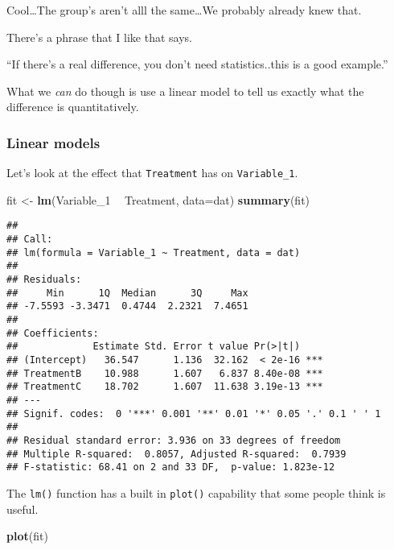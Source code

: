 \documentclass[
]{article}
\newenvironment{Shaded}{\begin{snugshade}}{\end{snugshade}}
\newcommand{\DataTypeTok}[1]{\textcolor[rgb]{0.13,0.29,0.53}{#1}}
\newcommand{\DecValTok}[1]{\textcolor[rgb]{0.00,0.00,0.81}{#1}}
\newcommand{\KeywordTok}[1]{\textcolor[rgb]{0.13,0.29,0.53}{\textbf{#1}}}
\newcommand{\NormalTok}[1]{#1}
\newcommand{\OperatorTok}[1]{\textcolor[rgb]{0.81,0.36,0.00}{\textbf{#1}}}
\newcommand{\StringTok}[1]{\textcolor[rgb]{0.31,0.60,0.02}{#1}}
\begin{document}
Cool\ldots{}The group's aren't alll the same\ldots{}We probably already
knew that.

There's a phrase that I like that says.

``If there's a real difference, you don't need statistics..this is a
good example.''

What we \emph{can} do though is use a linear model to tell us exactly
what the difference is quantitatively.

\hypertarget{linear-models}{%
\subsubsection{Linear models}\label{linear-models}}

Let's look at the effect that \texttt{Treatment} has on
\texttt{Variable\_1}.

\begin{Shaded}
\begin{Highlighting}[]
\NormalTok{fit <-}\StringTok{ }\KeywordTok{lm}\NormalTok{(Variable_}\DecValTok{1} \OperatorTok{~}\StringTok{ }\NormalTok{Treatment, }\DataTypeTok{data=}\NormalTok{dat)}
\KeywordTok{summary}\NormalTok{(fit)}
\end{Highlighting}
\end{Shaded}

\begin{verbatim}
## 
## Call:
## lm(formula = Variable_1 ~ Treatment, data = dat)
## 
## Residuals:
##     Min      1Q  Median      3Q     Max 
## -7.5593 -3.3471  0.4744  2.2321  7.4651 
## 
## Coefficients:
##             Estimate Std. Error t value Pr(>|t|)    
## (Intercept)   36.547      1.136  32.162  < 2e-16 ***
## TreatmentB    10.988      1.607   6.837 8.40e-08 ***
## TreatmentC    18.702      1.607  11.638 3.19e-13 ***
## ---
## Signif. codes:  0 '***' 0.001 '**' 0.01 '*' 0.05 '.' 0.1 ' ' 1
## 
## Residual standard error: 3.936 on 33 degrees of freedom
## Multiple R-squared:  0.8057, Adjusted R-squared:  0.7939 
## F-statistic: 68.41 on 2 and 33 DF,  p-value: 1.823e-12
\end{verbatim}

The \texttt{lm()} function has a built in \texttt{plot()} capability
that some people think is useful.

\begin{Shaded}
\begin{Highlighting}[]
\KeywordTok{plot}\NormalTok{(fit)}
\end{Highlighting}
\end{Shaded}
\end{document}
